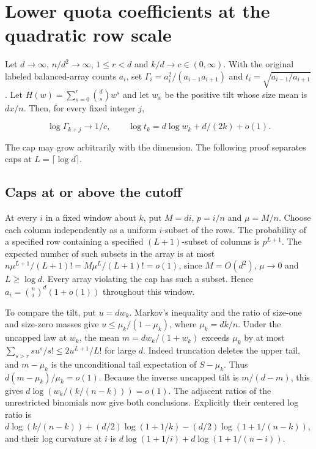 \section{Lower quota coefficients at the quadratic row scale}\label{sec:quadratic-lower-quota}

Let $d\to\infty$, $n/d^2\to\infty$, $1\le r<d$ and $k/d\to c\in(0,\infty)$. With the original labeled balanced-array counts $a_i$, set $\Gamma_i=a_i^2/(a_{i-1}a_{i+1})$ and $t_i=\sqrt{a_{i-1}/a_{i+1}}$. Let $H(w)=\sum_{s=0}^r\binom ds w^s$ and let $w_x$ be the positive tilt whose size mean is $dx/n$. Then, for every fixed integer $j$,

\begin{equation*}
\log\Gamma_{k+j}\to 1/c,\qquad \log t_k=d\log w_k+d/(2k)+o(1).
\end{equation*}

The cap may grow arbitrarily with the dimension. The following proof separates caps at $L=\lceil\log d\rceil$.

\subsection{Caps at or above the cutoff}

At every $i$ in a fixed window about $k$, put $M=di$, $p=i/n$ and $\mu=M/n$. Choose each column independently as a uniform $i$-subset of the rows. The probability of a specified row containing a specified $(L+1)$-subset of columns is $p^{L+1}$. The expected number of such subsets in the array is at most $n\mu^{L+1}/(L+1)!=M\mu^L/(L+1)!=o(1)$, since $M=O(d^2)$, $\mu\to0$ and $L\ge\log d$. Every array violating the cap has such a subset. Hence $a_i=\binom ni^d(1+o(1))$ throughout this window.

To compare the tilt, put $u=dw_k$. Markov's inequality and the ratio of size-one and size-zero masses give $u\le\mu_k/(1-\mu_k)$, where $\mu_k=dk/n$. Under the uncapped law at $w_k$, the mean $m=dw_k/(1+w_k)$ exceeds $\mu_k$ by at most $\sum_{s>r}s u^s/s!\le 2u^{L+1}/L!$ for large $d$. Indeed truncation deletes the upper tail, and $m-\mu_k$ is the unconditional tail expectation of $S-\mu_k$. Thus $d(m-\mu_k)/\mu_k=o(1)$. Because the inverse uncapped tilt is $m/(d-m)$, this gives $d\log(w_k/(k/(n-k)))=o(1)$. The adjacent ratios of the unrestricted binomials now give both conclusions. Explicitly their centered log ratio is $d\log(k/(n-k))+(d/2)\log(1+1/k)-(d/2)\log(1+1/(n-k))$, and their log curvature at $i$ is $d\log(1+1/i)+d\log(1+1/(n-i))$.

